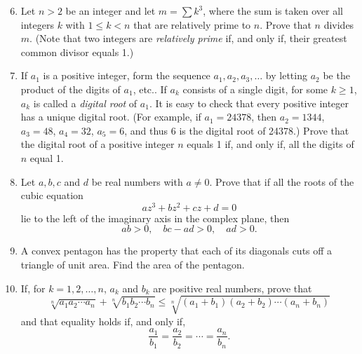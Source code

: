 \documentclass[12pt]{article}
\begin{document}
\begin{enumerate}
\setcounter{enumi}{5}
\item Let $n > 2$ be an integer and let $m = \sum k^3$, where the sum is taken over all integers $k$ with $1 \le k < n$ that are relatively prime to $n$. Prove that $n$ divides $m$. (Note that two integers are \emph{relatively prime} if, and only if, their greatest common divisor equals 1.)

\item If $a_1$ is a positive integer, form the sequence $a_1, a_2, a_3, \ldots$ by letting $a_2$ be the product of the digits of $a_1$, etc.. If $a_k$ consists of a single digit, for some $k \ge 1$, $a_k$ is called a \emph{digital root} of $a_1$. It is easy to check that every positive integer has a unique digital root. (For example, if $a_1 = 24378$, then $a_2 = 1344$, $a_3 = 48$, $a_4 = 32$, $a_5 = 6$, and thus 6 is the digital root of 24378.) Prove that the digital root of a positive integer $n$ equals 1 if, and only if, all the digits of $n$ equal 1.

\item Let $a, b, c$ and $d$ be real numbers with $a \ne 0$. Prove that if all the roots of the cubic equation \[az^3 + bz^2 + cz + d = 0\] lie to the left of the imaginary axis in the complex plane, then \[ab > 0, \quad bc - ad > 0, \quad ad > 0.\]

\item A convex pentagon has the property that each of its diagonals cuts off a triangle of unit area. Find the area of the pentagon.

\item If, for $k = 1, 2, \ldots, n$, $a_k$ and $b_k$ are positive real numbers, prove that \[\sqrt[n]{a_1a_2\cdots a_n} + \sqrt[n]{b_1b_2\cdots b_n} \le \sqrt[n]{(a_1+b_1)(a_2+b_2)\cdots(a_n+b_n)}\] and that equality holds if, and only if, \[\frac{a_1}{b_1} = \frac{a_2}{b_2} = \cdots = \frac{a_n}{b_n}.\]

\end{enumerate}
\end{document}
